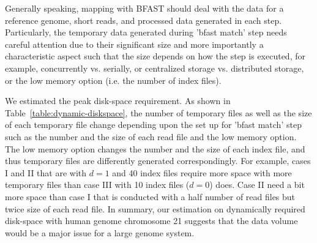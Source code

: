 \documentclass{acm_proc_article-sp}
\begin{document}



Generally speaking, mapping with BFAST should deal with the data for a
reference genome, short reads, and processed data generated in each
step.  Particularly, the temporary data generated during 'bfast match'
step needs careful attention due to their significant size and more
importantly a characteristic aspect such that the size depends on how
the step is executed, for example, concurrently vs. serially, or
centralized storage vs. distributed storage, or the low memory option
(i.e. the number of index files).

We estimated the peak disk-space requirement.  As shown
in Table~\ref{table:dynamic-diskspace}, the number of temporary files as
well as the size of each temporary file change depending upon the set
up for 'bfast match' step such as the number and the size of each read
file and the low memory option.  The low memory option changes the number and the size
of each index file, and thus temporary files are differently generated correspondingly.  For example, cases I and II that
are with $d=1$ and 40 index files require more space with more
temporary files than case III with 10 index files ($d=0$) does. Case
II need a bit more space than case I that is conducted with a half
number of read files but twice size of each read file.  In summary, our estimation on dynamically required disk-space with human
genome chromosome 21 suggests that the data volume would be a major
issue for a large genome system.
   
\end{document}
